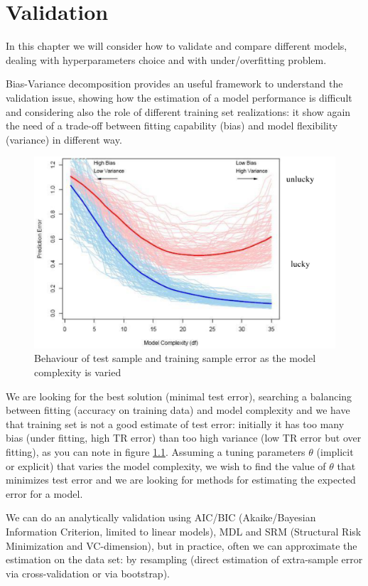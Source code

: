 \chapter{Validation}
In this chapter we will consider how to validate and compare different models, dealing with hyperparameters choice and with under/overfitting problem.

Bias-Variance decomposition provides an useful framework to understand the validation issue, showing how the estimation of a model performance is difficult and 
considering also the role of different training set realizations: it show again the need of a trade-off between fitting capability (bias) and model flexibility (variance) in different way.

\begin{figure}
	\caption{Behaviour of test sample and training sample error as the model complexity is varied}
	\label{img:biasVariance}
	\includegraphics[width=\textwidth]{images/biasVariance}
\end{figure}
We are looking for the best solution (minimal test error), searching a balancing between fitting (accuracy on training data) and model complexity and we have that training set is 
not a good estimate of test error: initially it has too many bias (under fitting, high TR error) than too high variance (low TR error but over fitting),
as you can note in figure \ref{img:biasVariance}.\newline
Assuming a tuning parameters $\theta$ (implicit or explicit) that varies the model complexity, we wish to find the value of  $\theta$ that minimizes test error and 
we are looking for methods for estimating the expected  error for a model.

We can do an analytically validation using AIC/BIC (Akaike/Bayesian Information Criterion, limited to linear models), MDL and SRM (Structural Risk Minimization and VC-dimension), but 
in practice, often we can approximate the estimation on the data set: by resampling (direct estimation of extra-sample error via cross-validation or via bootstrap).

